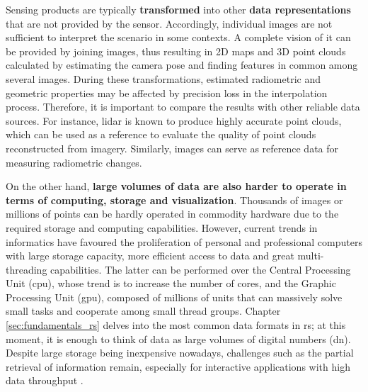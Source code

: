 Sensing products are typically \textbf{transformed} into other \textbf{data representations} that are not provided by the sensor. Accordingly, individual images are not sufficient to interpret the scenario in some contexts. A complete vision of it can be provided by joining images, thus resulting in 2D maps and 3D point clouds calculated by estimating the camera pose and finding features in common among several images. During these transformations, estimated radiometric and geometric properties may be affected by precision loss in the interpolation process. Therefore, it is important to compare the results with other reliable data sources. For instance, \acrshort{lidar} is known to produce highly accurate point clouds, which can be used as a reference to evaluate the quality of point clouds reconstructed from imagery. Similarly, images can serve as reference data for measuring radiometric changes.  

On the other hand, \textbf{large volumes of data are also harder to operate in terms of computing, storage and visualization}. Thousands of images or millions of points can be hardly operated in commodity hardware due to the required storage and computing capabilities. However, current trends in informatics have favoured the proliferation of personal and professional computers with large storage capacity, more efficient access to data and great multi-threading capabilities. The latter can be performed over the Central Processing Unit (\acrshort{cpu}), whose trend is to increase the number of cores, and the Graphic Processing Unit (\acrshort{gpu}), composed of millions of units that can massively solve small tasks and cooperate among small thread groups. Chapter \ref{sec:fundamentals_rs} delves into the most common data formats in \acrshort{rs}; at this moment, it is enough to think of data as large volumes of digital numbers (\acrshort{dn}). Despite large storage being inexpensive nowadays, challenges such as the partial retrieval of information remain, especially for interactive applications with high data throughput \cite{bejar-martos_strategies_2022, ogayar-anguita_nested_2023}. 

